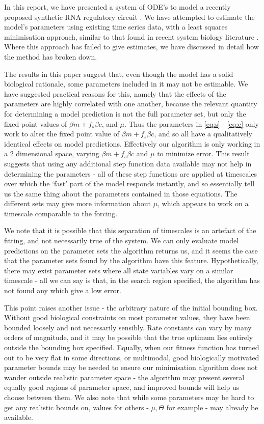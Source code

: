 \documentclass[10pt,journal]{./IEEE_latex_class/IEEEtran}
\begin{document}
In this report, we have presented a system of ODE's to model a recently proposed synthetic RNA regulatory circuit \cite{Rodrigo2012}. We have attempted to estimate the model's parameters using existing time series data, with a least squares minimisation approach, similar to that found in recent system biology literature \cite{Hu2015}. Where this approach has failed to give estimates, we have discussed in detail how the method has broken down.

 
The results in this paper suggest that, even though the model has a solid biological rationale, some parameters included in it may not be estimable. We have suggested practical reasons for this, namely that the effects of the parameters are highly correlated with one another, because the relevant quantity for determining a model prediction is not the full parameter set, but only the fixed point values of $\beta m +f_{s}\beta c$, and $\mu$. Thus the parameters in \eqref{eq:s} - \eqref{eq:c} only work to alter the fixed point value of $\beta m +f_{s}\beta c$, and so all have a qualitatively identical effects on model predictions. Effectively our algorithm is only working in a 2 dimensional space, varying $\beta m +f_{s}\beta c$ and $\mu$ to minimize error. This result suggests that using any additional step function data available may not help in determining the parameters - all of these step functions are applied at timescales over which the `fast' part of the model responds instantly, and so essentially tell us the same thing about the parameters contained in those equations. The different sets may give more information about $\mu$, which appears to work on a timescale comparable to the forcing.  

We note that it is possible that this separation of timescales is an artefact of the fitting, and not necessarily true of the system. We can only evaluate model predictions on the parameter sets the algorithm returns us, and it seems the case that the parameter sets found by the algorithm have this feature. Hypothetically, there may exist parameter sets where all state variables vary on a similar timescale - all we can say is that, in the search region specified, the algorithm has not found any which give a low error. 

This point raises another issue - the arbitrary nature of the initial bounding box. Without good biological constraints on most parameter values, they have been bounded loosely and not necessarily sensibly. Rate constants can vary by many orders of magnitude, and it may be possible that the true optimum lies entirely outside the bounding box specified. Equally,  when our fitness function has turned out to be very flat in some directions, or multimodal, good biologically motivated parameter bounds may be needed to ensure our minimisation algorithm does not wander outside realistic parameter space - the algorithm may present several equally good regions of parameter space, and improved bounds will help us choose between them. We also note that while some parameters may be hard to get any realistic bounds on, values for others - $\mu, \Theta$ for example - may already be available.
\end{document}
